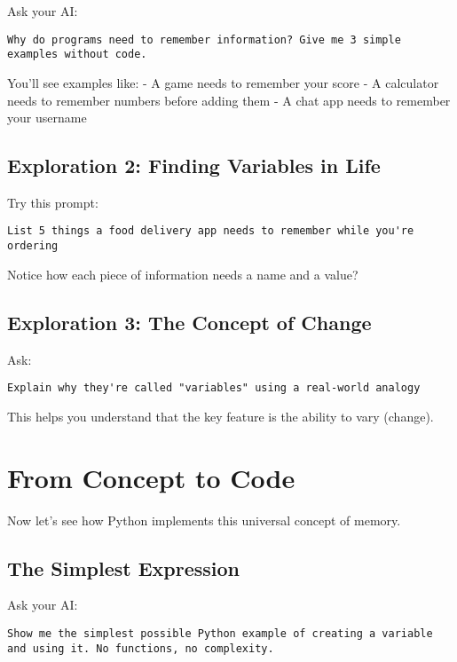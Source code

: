 \documentclass[
  letterpaper,
  DIV=11,
  numbers=noendperiod,
  oneside]{scrreprt}
\begin{document}
Ask your AI:

\begin{verbatim}
Why do programs need to remember information? Give me 3 simple examples without code.
\end{verbatim}

You'll see examples like: - A game needs to remember your score - A
calculator needs to remember numbers before adding them - A chat app
needs to remember your username

\subsection{Exploration 2: Finding Variables in
Life}\label{exploration-2-finding-variables-in-life}

Try this prompt:

\begin{verbatim}
List 5 things a food delivery app needs to remember while you're ordering
\end{verbatim}

Notice how each piece of information needs a name and a value?

\subsection{Exploration 3: The Concept of
Change}\label{exploration-3-the-concept-of-change}

Ask:

\begin{verbatim}
Explain why they're called "variables" using a real-world analogy
\end{verbatim}

This helps you understand that the key feature is the ability to vary
(change).

\section{From Concept to Code}\label{from-concept-to-code-1}

Now let's see how Python implements this universal concept of memory.

\subsection{The Simplest Expression}\label{the-simplest-expression-1}

Ask your AI:

\begin{verbatim}
Show me the simplest possible Python example of creating a variable and using it. No functions, no complexity.
\end{verbatim}
\end{document}
